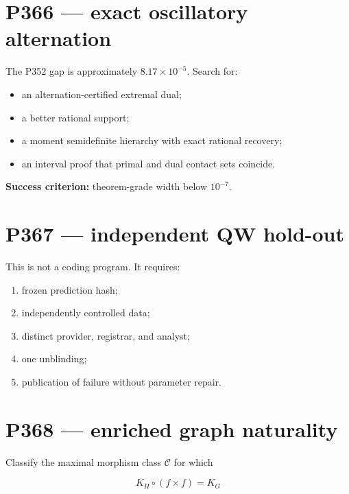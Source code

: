 \documentclass[11pt,a4paper,openany]{report}
\begin{document}
\section{P366 --- exact oscillatory alternation}

The P352 gap is approximately \(8.17\times10^{-5}\). Search for:

\begin{itemize}
\item 
an alternation-certified extremal dual;

\item 
a better rational support;

\item 
a moment semidefinite hierarchy with exact rational recovery;

\item 
an interval proof that primal and dual contact sets coincide.

\end{itemize}

\textbf{Success criterion:} theorem-grade width below \(10^{-7}\).

\section{P367 --- independent QW hold-out}

This is not a coding program. It requires:

\begin{enumerate}
\item 
frozen prediction hash;

\item 
independently controlled data;

\item 
distinct provider, registrar, and analyst;

\item 
one unblinding;

\item 
publication of failure without parameter repair.

\end{enumerate}

\section{P368 --- enriched graph naturality}

Classify the maximal morphism class \(\mathcal C\) for which

\[
K_H\circ(f\times f)=K_G
\]
\end{document}
